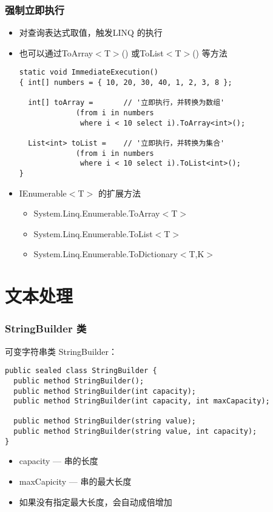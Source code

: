 \begin{frame}[fragile]
\frametitle{强制立即执行}
\begin{itemize}
\item 对查询表达式取值，触发LINQ 的执行
\item 也可以通过ToArray$<$T$>$() 或ToList$<$T$>$() 等方法
\begin{lstlisting}[escapeinside='']
static void ImmediateExecution()
{ int[] numbers = { 10, 20, 30, 40, 1, 2, 3, 8 };

  int[] toArray =       // '立即执行，并转换为数组'
             (from i in numbers 
              where i < 10 select i).ToArray<int>();

  List<int> toList =    // '立即执行，并转换为集合'
             (from i in numbers
              where i < 10 select i).ToList<int>();
}
\end{lstlisting}
\item IEnumerable$<$T$>$ 的扩展方法
\begin{itemize}
\item System.Linq.Enumerable.ToArray$<$T$>$
\item System.Linq.Enumerable.ToList$<$T$>$
\item System.Linq.Enumerable.ToDictionary$<$T,K$>$
\end{itemize}
\end{itemize}
\end{frame}


\section{文本处理}

\begin{frame}[fragile]
\frametitle{StringBuilder 类}
可变字符串类 StringBuilder：
\begin{lstlisting}
public sealed class StringBuilder {
  public method StringBuilder();  
  public method StringBuilder(int capacity);  
  public method StringBuilder(int capacity, int maxCapacity);  
  
  public method StringBuilder(string value);  
  public method StringBuilder(string value, int capacity);  
}
\end{lstlisting}
\begin{itemize}
\item capacity --- 串的长度
\item maxCapicity --- 串的最大长度
\item 如果没有指定最大长度，会自动成倍增加
\end{itemize}
\end{frame}

